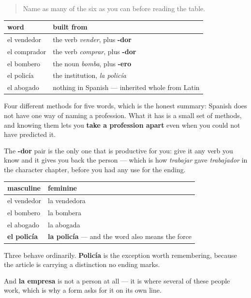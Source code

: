 \label{lesson:ES-C427-repaso-oficios}



\begin{quote}
Name as many of the six as you can before reading the table.
\end{quote}

\begin{grammarlens}[title={Grammar Lens: four ways to name a person}]
\noindent
\begin{tabularx}{\linewidth}{@{}>{\raggedright\arraybackslash}X>{\raggedright\arraybackslash}X@{}}
\toprule
\textbf{word} & \textbf{built from} \\
\midrule
el vendedor & the verb \emph{vender}, plus \textbf{-dor} \\
el comprador & the verb \emph{comprar}, plus \textbf{-dor} \\
el bombero & the noun \emph{bomba}, plus \textbf{-ero} \\
el policía & the institution, \emph{la policía} \\
el abogado & nothing in Spanish — inherited whole from Latin \\
\bottomrule
\end{tabularx}

Four different methods for five words, which is the honest summary: Spanish does not have one way of naming a profession. What it has is a small set of methods, and knowing them lets you \textbf{take a profession apart} even when you could not have predicted it.

The \textbf{-dor} pair is the only one that is productive for you: give it any verb you know and it gives you back the person — which is how \emph{trabajar} gave \emph{trabajador} in the character chapter, before you had any use for the ending.
\end{grammarlens}

\begin{grammarlens}[title={Grammar Lens: which ones change, and how}]
\noindent
\begin{tabularx}{\linewidth}{@{}>{\raggedright\arraybackslash}X>{\raggedright\arraybackslash}X@{}}
\toprule
\textbf{masculine} & \textbf{feminine} \\
\midrule
el vendedor & la vendedora \\
el bombero & la bombera \\
el abogado & la abogada \\
\textbf{el policía} & \textbf{la policía} — and the word also means the force \\
\bottomrule
\end{tabularx}

Three behave ordinarily. \textbf{Policía} is the exception worth remembering, because the article is carrying a distinction no ending marks.

And \textbf{la empresa} is not a person at all — it is where several of these people work, which is why a form asks for it on its own line.
\end{grammarlens}

